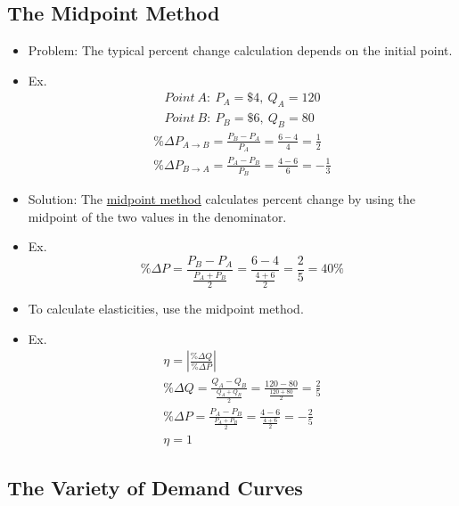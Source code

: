 \subsection{The Midpoint Method}

\begin{itemize}

	\item Problem: The typical percent change calculation depends on the initial point.
	
	\item Ex.
		\begin{gather*}
		Point \ A: \ P_A = \$4, \ Q_A = 120 \\
		Point \ B: \ P_B = \$6, \ Q_B = 80
		\end{gather*}
		\begin{gather*}
		\% \Delta P_{A \rightarrow B} = \frac{P_B - P_A}{P_A} = \frac{6 - 4}{4} = \frac{1}{2} \\
		\% \Delta P_{B \rightarrow A} = \frac{P_A - P_B}{P_B} = \frac{4 - 6}{6} = -\frac{1}{3}
		\end{gather*}
	
	\item Solution: The \underline{midpoint method} calculates percent change by using the midpoint of the two values in the denominator. 
	
	\item Ex. \[ \% \Delta P = \frac{P_B - P_A}{\frac{P_A + P_B}{2}} = \frac{6 - 4}{\frac{4 + 6}{2}}  = \frac{2}{5} = 40\% \]
	
	\item To calculate elasticities, use the midpoint method.
	
	\item Ex. 
	\begin{gather*}
	\eta = \left| \frac{\% \Delta Q}{\% \Delta P} \right| \\
	\% \Delta Q = \frac{Q_A - Q_B}{\frac{Q_A + Q_B}{2}} = \frac{120 - 80}{\frac{120 + 80}{2}} = \frac{2}{5} \\
	\% \Delta P = \frac{P_A - P_B}{\frac{P_A + P_B}{2}} = \frac{4 - 6}{\frac{4 + 6}{2}} = -\frac{2}{5} \\
	\eta = 1
	\end{gather*}
		
\end{itemize}



\subsection{The Variety of Demand Curves}


